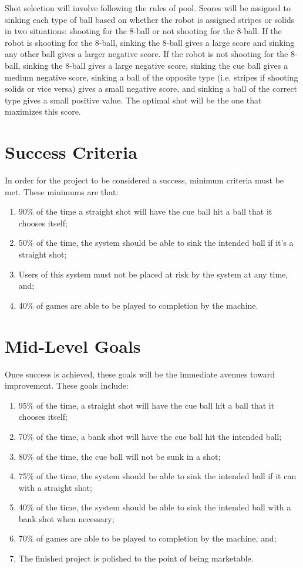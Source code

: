 \documentclass[titlepage]{article}
\begin{document}
Shot selection will involve following the rules of pool. Scores will be assigned to sinking each type of ball based on whether the robot is assigned stripes or solids in two situations: shooting for the 8-ball or not shooting for the 8-ball. If the robot is shooting for the 8-ball, sinking the 8-ball gives a large score and sinking any other ball gives a larger negative score. If the robot is not shooting for the 8-ball, sinking the 8-ball gives a large negative score, sinking the cue ball gives a medium negative score, sinking a ball of the opposite type (i.e. stripes if shooting solids or vice versa) gives a small negative score, and sinking a ball of the correct type gives a small positive value. The optimal shot will be the one that maximizes this score.

\section{Success Criteria}
In order for the project to be considered a success, minimum criteria must be met. These minimums are that:
\begin{enumerate}
	\item 90\% of the time a straight shot will have the cue ball hit a ball that it chooses itself;
	\item 50\% of the time, the system should be able to sink the intended ball if it's a straight shot;
	\item Users of this system must not be placed at risk by the system at any time, and;
	\item 40\% of games are able to be played to completion by the machine.
\end{enumerate}

\section{Mid-Level Goals}
Once success is achieved, these goals will be the immediate avenues toward improvement. These goals include:
\begin{enumerate}
	\item 95\% of the time, a straight shot will have the cue ball hit a ball that it chooses itself;
	\item 70\% of the time, a bank shot will have the cue ball hit the intended ball;
	\item 80\% of the time, the cue ball will not be sunk in a shot;
	\item 75\% of the time, the system should be able to sink the intended ball if it can with a straight shot;
	\item 40\% of the time, the system should be able to sink the intended ball with a bank shot when necessary;
	\item 70\% of games are able to be played to completion by the machine, and;
	\item The finished project is polished to the point of being marketable.
\end{enumerate}
\end{document}
